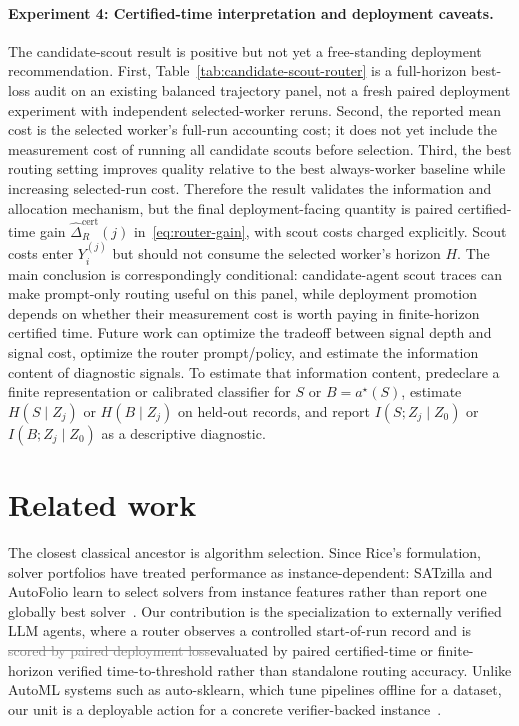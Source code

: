 \documentclass{article}
\newcommand{\oldtext}[1]{\textcolor{gray}{\sout{#1}}}
\newcommand{\newtext}[1]{\textcolor{green!50!black}{#1}}
\newcounter{algorithm}
\begin{document}
\paragraph{\newtext{Experiment 4: Certified-time interpretation and deployment caveats.}}
The candidate-scout result is positive but not yet a free-standing deployment recommendation.
First, Table~\ref{tab:candidate-scout-router} is a full-horizon best-loss audit on an existing balanced trajectory panel, not a fresh paired deployment experiment with independent selected-worker reruns.
Second, the reported mean cost is the selected worker's full-run accounting cost; it does not yet include the measurement cost of running all candidate scouts before selection.
Third, the best routing setting improves quality relative to the best always-worker baseline while increasing selected-run cost.
Therefore the result validates the information and allocation mechanism, but the final deployment-facing quantity is paired certified-time gain \(\widehat\Delta_R^{\mathrm{cert}}(j)\) in~\eqref{eq:router-gain}, with scout costs charged explicitly.
Scout costs enter \(Y_i^{(j)}\) but should not consume the selected worker's horizon \(H\).
The main conclusion is correspondingly conditional: candidate-agent scout traces can make prompt-only routing useful on this panel, while deployment promotion depends on whether their measurement cost is worth paying in finite-horizon certified time.
Future work can optimize the tradeoff between signal depth and signal cost, optimize the router prompt/policy, and estimate the information content of diagnostic signals.
To estimate that information content, predeclare a finite representation or calibrated classifier for \(S\) or \(B=a^\star(S)\), estimate \(H(S\mid Z_j)\) or \(H(B\mid Z_j)\) on held-out records, and report \(I(S;Z_j\mid Z_0)\) or \(I(B;Z_j\mid Z_0)\) as a descriptive diagnostic.



\section{Related work}
\label{sec:related}

The closest classical ancestor is algorithm selection.
Since Rice's formulation, solver portfolios have treated performance as instance-dependent: SATzilla and AutoFolio learn to select solvers from instance features rather than report one globally best solver~\citep{rice1976algorithm,xu2012satzilla,lindauer2015autofolio,kotthoff2016algorithm}.
Our contribution is the specialization to externally verified LLM agents, where a router observes a controlled start-of-run record and is \oldtext{scored by paired deployment loss}\newtext{evaluated by paired certified-time or finite-horizon verified time-to-threshold rather than standalone routing accuracy}.
Unlike AutoML systems such as auto-sklearn, which tune pipelines offline for a dataset, our unit is a deployable action for a concrete verifier-backed instance~\citep{feurer2015autosklearn}.
\end{document}

